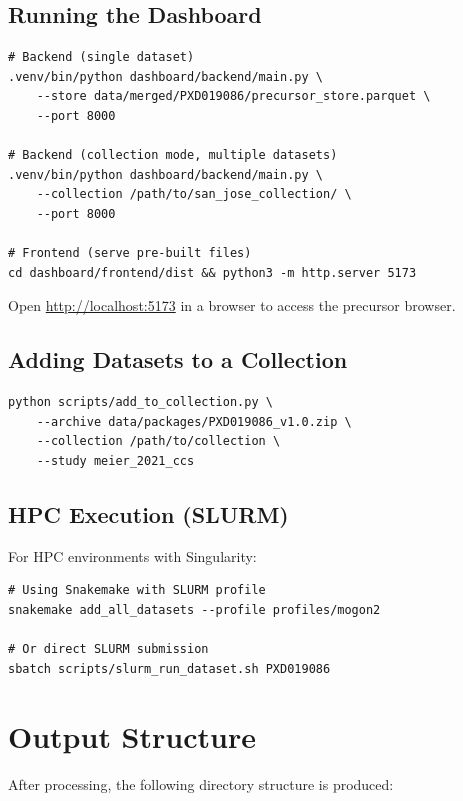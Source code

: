 \documentclass[10pt,twoside]{article}
\begin{document}
\subsection{Running the Dashboard}

\begin{verbatim}
# Backend (single dataset)
.venv/bin/python dashboard/backend/main.py \
    --store data/merged/PXD019086/precursor_store.parquet \
    --port 8000

# Backend (collection mode, multiple datasets)
.venv/bin/python dashboard/backend/main.py \
    --collection /path/to/san_jose_collection/ \
    --port 8000

# Frontend (serve pre-built files)
cd dashboard/frontend/dist && python3 -m http.server 5173
\end{verbatim}

Open \url{http://localhost:5173} in a browser to access the precursor browser.

\subsection{Adding Datasets to a Collection}

\begin{verbatim}
python scripts/add_to_collection.py \
    --archive data/packages/PXD019086_v1.0.zip \
    --collection /path/to/collection \
    --study meier_2021_ccs
\end{verbatim}

\subsection{HPC Execution (SLURM)}

For HPC environments with Singularity:

\begin{verbatim}
# Using Snakemake with SLURM profile
snakemake add_all_datasets --profile profiles/mogon2

# Or direct SLURM submission
sbatch scripts/slurm_run_dataset.sh PXD019086
\end{verbatim}

\section{Output Structure}

After processing, the following directory structure is produced:
\end{document}
